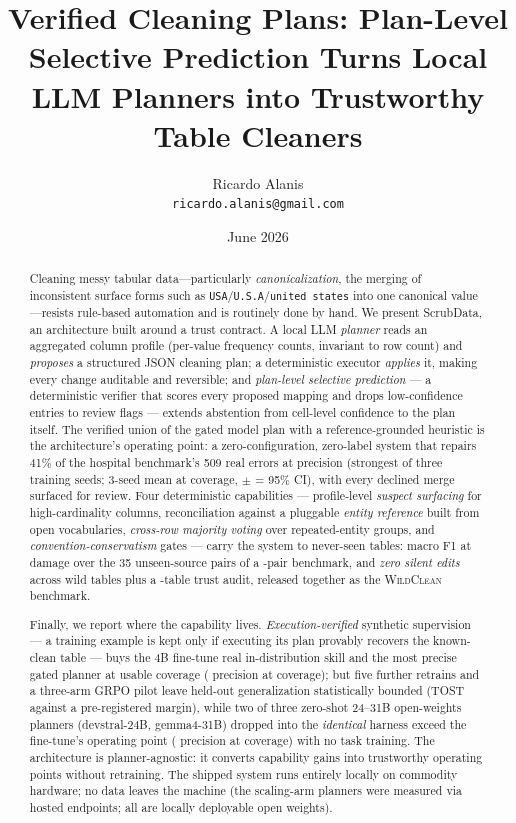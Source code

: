 \documentclass[11pt]{article}
\title{Verified Cleaning Plans: Plan-Level Selective Prediction Turns Local LLM
Planners into Trustworthy Table Cleaners}
\author{Ricardo Alanis\\ \small{\texttt{ricardo.alanis@gmail.com}}}
\date{June 2026}
\begin{document}
\maketitle

\begin{abstract}
Cleaning messy tabular data---particularly \emph{canonicalization}, the merging of
inconsistent surface forms such as \texttt{USA}/\texttt{U.S.A}/\texttt{united states}
into one canonical value---resists rule-based automation and is routinely done by hand.
We present ScrubData, an architecture built around a trust contract. A local LLM
\emph{planner} reads an aggregated column profile (per-value frequency counts,
invariant to row count) and \emph{proposes} a structured JSON cleaning plan; a
deterministic executor \emph{applies} it, making every change auditable and reversible;
and \emph{plan-level selective prediction} --- a deterministic verifier that scores
every proposed mapping and drops low-confidence entries to review flags --- extends
abstention from cell-level confidence to the plan itself. The verified union of the
gated model plan with a reference-grounded heuristic is the architecture's operating
point: a zero-configuration, zero-label system that repairs 41\% of the hospital
benchmark's 509 real errors at \unionGatePrec{} precision (strongest of three training
seeds; 3-seed mean \unionGateThreeSeedPrec{} at \unionGateThreeSeedCov{} coverage,
$\pm$ = 95\% CI),
with every declined merge surfaced for review. Four deterministic capabilities ---
profile-level \emph{suspect surfacing} for high-cardinality columns, reconciliation
against a pluggable \emph{entity reference} built from open vocabularies,
\emph{cross-row majority voting} over repeated-entity groups, and
\emph{convention-conservatism} gates --- carry the system to never-seen tables:
macro F1 \unseenMacroF{} at \unseenMacroDamage{} damage over the 35 unseen-source
pairs of a \nPairs-pair benchmark, and \emph{zero silent edits} across \nWild{} wild
tables plus a \nTrust-table trust audit, released together as the \textsc{WildClean}
benchmark.

Finally, we report where the capability lives. \emph{Execution-verified} synthetic
supervision --- a training example is kept only if executing its plan provably
recovers the known-clean table --- buys the 4B fine-tune real in-distribution skill
and the most precise gated planner at usable coverage (\modelGatePrec{} precision at
\modelGateCov{} coverage); but five further retrains and a three-arm GRPO pilot leave
held-out generalization statistically bounded (TOST against a pre-registered margin),
while two of three zero-shot 24--31B open-weights planners (devstral-24B, gemma4-31B)
dropped into the \emph{identical} harness exceed the fine-tune's operating point
(\scalePrecBig{} precision at \scaleCovBig{} coverage) with no task training. The
architecture is planner-agnostic: it converts capability gains into trustworthy
operating points without retraining. The shipped system runs entirely locally on commodity hardware;
no data leaves the machine (the scaling-arm planners were measured via hosted
endpoints; all are locally deployable open weights).
\end{abstract}
\end{document}
